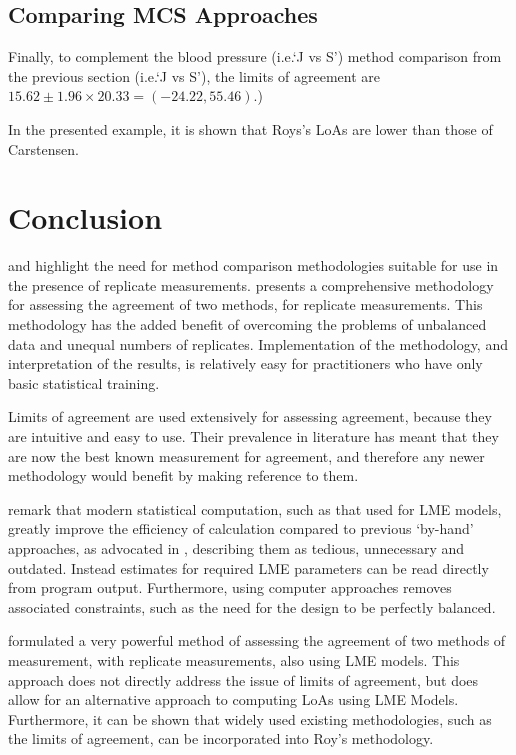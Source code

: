 \documentclass[12pt, a4paper]{report}
\theoremstyle{plain}
\theoremstyle{definition}
\theoremstyle{remark}
\begin{document}


\subsection{Comparing MCS Approaches}




Finally, to complement the blood pressure (i.e.`J vs S') method comparison from the previous section (i.e.`J vs S'), the limits of agreement are $15.62 \pm 1.96 \times 20.33 = (-24.22, 55.46)$.)

In the presented example, it is shown that Roys's LoAs are lower than those of Carstensen.



\section{Conclusion}
\citet{BXC2008} and \citet{ARoy2009} highlight the need for method comparison methodologies suitable for use in the presence of replicate measurements. \citet{ARoy2009} presents a comprehensive methodology for assessing the agreement of two methods, for replicate measurements. This methodology has the added benefit of overcoming the problems of unbalanced data and unequal numbers of replicates. Implementation of the methodology, and interpretation of the results, is relatively easy for practitioners who have only basic statistical training. 

Limits of agreement are used extensively for assessing agreement, because they are intuitive and easy to use. Their prevalence in literature has meant that they are now the best known measurement for agreement, and therefore any newer methodology would benefit by making reference to them.

\citet{BXC2008} remark that modern statistical computation, such as that used for LME models, greatly improve the efficiency of calculation compared to previous `by-hand' approaches, as advocated in \citet{BA99}, describing them as tedious, unnecessary and outdated. Instead estimates for required LME parameters can be read directly from program output. Furthermore, using computer approaches removes associated constraints, such as the need for the design to be perfectly balanced.

\citet{ARoy2009} formulated a very powerful method of assessing the agreement of two methods of measurement, with replicate measurements, also using LME models. This approach does not directly address the issue of limits of agreement, but does allow for an alternative approach to computing LoAs using LME Models.
 Furthermore, it can be shown that widely used existing methodologies, such as the limits of agreement, can be incorporated into Roy's methodology.







\end{document}
